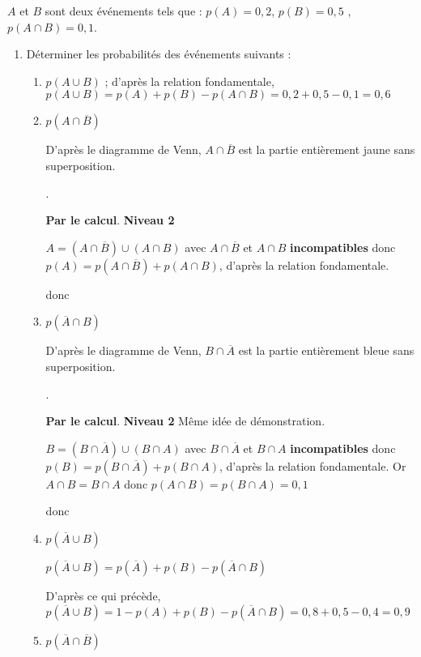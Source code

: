 \documentclass[openany]{book}
\begin{document}
	$A$ et $B$ sont deux événements tels que :
 $ p(A)=0,2$,  $p(B)=0,5$ , $p(A \cap B) = 0,1$.
\begin{enumerate}
\item Déterminer les probabilités des événements suivants :
 

 

	\begin{enumerate}
	\item $p(A \cup B)$	; d'après la relation fondamentale,  $ p(A \cup B)=p(A)+p(B)-p(A \cap B)=0,2+0,5- 0,1=0,6$
	\item $p(A \cap \overline{B})$
	
	D'après le diagramme de Venn, $A \cap \overline{B}$ est la partie entièrement jaune sans superposition.
	
	.
	
	\textbf{Par le calcul}. \textbf{Niveau 2}
	
	$A = (A \cap \overline{B}) \cup (A \cap B)$ avec  $A \cap \overline{B}$ et $A \cap B $ \textbf{incompatibles} donc $p(A) = p(A \cap \overline{B}) + p(A \cap B)$, d'après la relation fondamentale. 
	
	donc 
	
	\item $p(\overline{A} \cap B)$
	
		D'après le diagramme de Venn, $B \cap \overline{A}$ est la partie entièrement bleue sans superposition.
	
	.
	
	\textbf{Par le calcul}. \textbf{Niveau 2} Même idée de démonstration. 

$B = (B \cap \overline{A}) \cup (B \cap A)$ avec  $B \cap \overline{A}$ et $B \cap A $ \textbf{incompatibles} donc $p(B) = p(B \cap \overline{A}) + p(B \cap A)$, d'après la relation fondamentale. Or $A \cap B = B \cap A$ donc $p(A \cap B)=p(B \cap A)=0,1$
	
	donc 
	
	
	\item $p(\overline{A} \cup B)$
	
$p(\overline{A} \cup B) = p(\overline{A})+p(B)-p(\overline{A} \cap B)$

D'après ce qui précède, $p(\overline{A} \cup B) = 1- p(A)+p(B)-p(\overline{A} \cap B) = 0,8+0,5-0,4=0,9$
	
	
	\item $p(\overline{A} \cap \overline{B})$
	

\end{enumerate}
\end{enumerate}
\end{document}
